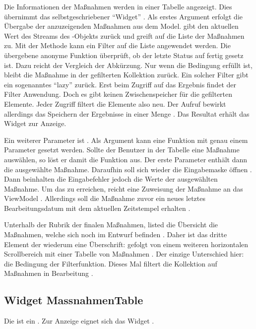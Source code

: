 Die Informationen der Maßnahmen werden in einer Tabelle angezeigt.
Dies übernimmt das selbstgeschriebener \enquote{Widget}  .
Als erstes Argument erfolgt die Übergabe der anzuzeigenden Maßnahmen aus dem Model.  gibt den aktuellen Wert des Streams des -Objekts zurück und greift auf die Liste der Maßnahmen zu. Mit der Methode   kann ein Filter auf die Liste angewendet werden. Die übergebene anonyme Funktion    überprüft, ob der letzte Status auf fertig gesetz ist. Dazu reicht der Vergleich der Abkürzung. Nur wenn die Bedingung erfüllt ist, bleibt die Maßnahme in der gefilterten Kollektion zurück. Ein solcher Filter gibt ein sogenanntes \enquote{lazy}  zurück. Erst beim Zugriff auf das Ergebnis findet der Filter Anwendung. Doch es gibt keinen Zwischenspeicher für die gefilterten Elemente. Jeder Zugriff filtert die Elemente also neu. Der Aufruf  bewirkt allerdings das Speichern der Ergebnisse in einer Menge . Das Resultat erhält das Widget  zur Anzeige.

Ein weiterer Parameter ist  .
Als Argument kann eine Funktion mit genau einem Parameter gesetzt werden.
Sollte der Benutzer in der Tabelle eine Maßnahme auswählen, so löst er damit die Funktion aus.
Der erste Parameter enthält dann die ausgewählte Maßnahme.
Daraufhin soll sich wieder die Eingabemaske öffnen .
Dann beinhalten die Eingabefehler jedoch die Werte der ausgewählten Maßnahme.  Um das zu erreichen, reicht eine Zuweisung der Maßnahme an das ViewModel . Allerdings soll die Maßnahme zuvor ein neues letztes Bearbeitungsdatum mit dem aktuellen Zeitstempel erhalten .

Unterhalb der Rubrik der finalen Maßnahmen, listed die Übersicht die Maßnahmen, welche sich noch im Entwurf befinden .
Daher ist das dritte Element der  wiederum eine Überschrift:   gefolgt von einem weiteren horizontalen Scrollbereich  mit einer Tabelle von Maßnahmen .
Der einzige Unterschied hier: die Bedingung der Filterfunktion.
Dieses Mal filtert die Kollektion auf Maßnahmen in Bearbeitung .


\subsection{Widget MassnahmenTable}

Die  ist ein   .
Zur Anzeige eignet sich das Widget  . 



